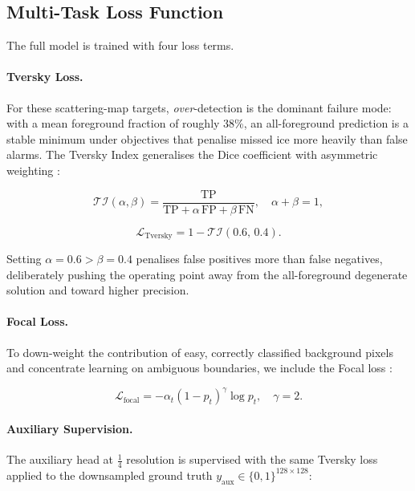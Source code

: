 \documentclass[remotesensing,article,accept,moreauthors,pdftex]{Definitions/mdpi}
\begin{document}
\subsection{Multi-Task Loss Function}
\label{sec:loss}

The full model is trained with four loss terms.

\paragraph{Tversky Loss.}
For these scattering-map targets, \emph{over}-detection is the dominant
failure mode: with a mean foreground fraction of roughly 38\%, an
all-foreground prediction is a stable minimum under objectives that penalise
missed ice more heavily than false alarms. The Tversky Index generalises the
Dice coefficient with asymmetric weighting \cite{salehi2017tversky}:

\begin{equation}
  \mathcal{TI}(\alpha, \beta) =
  \frac{\text{TP}}{\text{TP} + \alpha\,\text{FP} + \beta\,\text{FN}},
  \quad \alpha + \beta = 1,
  \label{eq:tversky_index}
\end{equation}

\begin{equation}
  \mathcal{L}_{\text{Tversky}} = 1 - \mathcal{TI}(0.6,\, 0.4).
  \label{eq:tversky_loss}
\end{equation}

\noindent Setting $\alpha = 0.6 > \beta = 0.4$ penalises false positives more
than false negatives, deliberately pushing the operating point away from the
all-foreground degenerate solution and toward higher precision.

\paragraph{Focal Loss.}
To down-weight the contribution of easy, correctly classified background pixels
and concentrate learning on ambiguous boundaries, we include the Focal loss
\cite{lin2017focal}:

\begin{equation}
  \mathcal{L}_{\text{focal}} =
  -\alpha_t \left(1 - p_t\right)^{\!\gamma} \log p_t,
  \quad \gamma = 2.
  \label{eq:focal}
\end{equation}

\paragraph{Auxiliary Supervision.}
The auxiliary head at $\frac{1}{4}$ resolution is supervised with the same
Tversky loss applied to the downsampled ground truth
$y_{\text{aux}} \in \{0,1\}^{128 \times 128}$:
\end{document}
